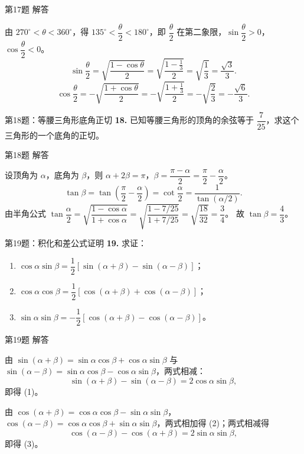 \documentclass[10pt,aspectratio=169,serif]{beamer}
\begin{document}
\begin{frame}[t]{第17题 解答}
\begin{tcolorbox}[colback=orange!10,colframe=orange,title=\textbf{解}]
由 $270^\circ<\theta<360^\circ$，得 $135^\circ<\dfrac{\theta}{2}<180^\circ$，即 $\dfrac{\theta}{2}$ 在第二象限，$\sin\dfrac{\theta}{2}>0$，$\cos\dfrac{\theta}{2}<0$。
\[
\sin\frac{\theta}{2}=\sqrt{\frac{1-\cos\theta}{2}}=\sqrt{\frac{1-\frac13}{2}}=\sqrt{\frac13}=\frac{\sqrt3}{3}.
\]
\[
\cos\frac{\theta}{2}=-\sqrt{\frac{1+\cos\theta}{2}}=-\sqrt{\frac{1+\frac13}{2}}=-\sqrt{\frac23}=-\frac{\sqrt6}{3}.
\]
\end{tcolorbox}
\end{frame}

\begin{frame}[t]{第18题：等腰三角形底角正切}
\textbf{18.} 已知等腰三角形的顶角的余弦等于 $\dfrac{7}{25}$，求这个三角形的一个底角的正切。
\end{frame}

\begin{frame}[t]{第18题 解答}
\begin{tcolorbox}[colback=orange!10,colframe=orange,title=\textbf{解}]
设顶角为 $\alpha$，底角为 $\beta$，则 $\alpha+2\beta=\pi$，$\beta=\dfrac{\pi-\alpha}{2}=\dfrac{\pi}{2}-\dfrac{\alpha}{2}$。
\[
\tan\beta=\tan\!\left(\frac{\pi}{2}-\frac{\alpha}{2}\right)=\cot\frac{\alpha}{2}=\frac{1}{\tan(\alpha/2)}.
\]
由半角公式 $\tan\dfrac{\alpha}{2}=\sqrt{\dfrac{1-\cos\alpha}{1+\cos\alpha}}=\sqrt{\dfrac{1-7/25}{1+7/25}}=\sqrt{\dfrac{18}{32}}=\dfrac34$。
故 $\tan\beta=\dfrac43$。
\end{tcolorbox}
\end{frame}

\begin{frame}[t]{第19题：积化和差公式证明}
\textbf{19.} 求证：
\begin{enumerate}
  \item $\cos\alpha\sin\beta=\dfrac12[\sin(\alpha+\beta)-\sin(\alpha-\beta)]$；
  \item $\cos\alpha\cos\beta=\dfrac12[\cos(\alpha+\beta)+\cos(\alpha-\beta)]$；
  \item $\sin\alpha\sin\beta=-\dfrac12[\cos(\alpha+\beta)-\cos(\alpha-\beta)]$。
\end{enumerate}
\end{frame}

\begin{frame}[t]{第19题 解答}
\begin{tcolorbox}[colback=orange!10,colframe=orange,title=\textbf{证明}]
由 $\sin(\alpha+\beta)=\sin\alpha\cos\beta+\cos\alpha\sin\beta$ 与 $\sin(\alpha-\beta)=\sin\alpha\cos\beta-\cos\alpha\sin\beta$，两式相减：
\[
\sin(\alpha+\beta)-\sin(\alpha-\beta)=2\cos\alpha\sin\beta,
\]
即得 (1)。

由 $\cos(\alpha+\beta)=\cos\alpha\cos\beta-\sin\alpha\sin\beta$，$\cos(\alpha-\beta)=\cos\alpha\cos\beta+\sin\alpha\sin\beta$，两式相加得 (2)；两式相减得
\[
\cos(\alpha-\beta)-\cos(\alpha+\beta)=2\sin\alpha\sin\beta,
\]
即得 (3)。
\end{tcolorbox}
\end{frame}
\end{document}
